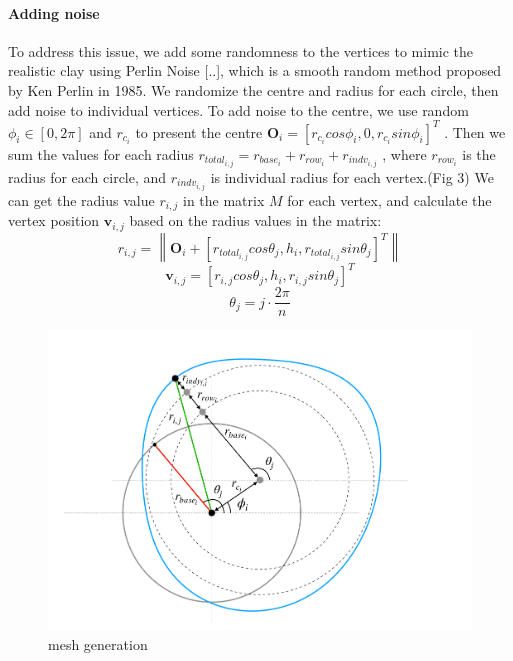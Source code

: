 \paragraph{Adding noise} To address this issue, we add some randomness to the vertices to mimic the realistic clay using Perlin Noise [..], which is a smooth random method proposed by Ken Perlin in 1985. We randomize the centre and radius for each circle, then add noise to individual vertices.
To add noise to the centre, we use random $\phi_{i} \in [0, 2\pi]$ and $r_{c_{i}}$ to present the centre
$\mathbf{O}_{i} = \left[r_{c_{i}}cos\phi_{i}, 0, r_{c_{i}}sin\phi_{i}\right]^T$
. Then we sum the values for each radius
$r_{total_{i,j}} = r_{base_{i}} + r_{row_{i}} + r_{indv_{i,j}}$
, where $r_{row_{i}}$ is the radius for each circle, and $r_{indv_{i,j}}$ is individual radius for each vertex.(Fig 3) We can get the radius value $r_{i,j}$ in the matrix $M$ for each vertex, and calculate the vertex position $\mathbf{v}_{i,j}$ based on the radius values in the matrix:
\begin{equation}
r_{i,j} = \left\|
\mathbf{O}_{i} + \left[ r_{total_{i,j}} cos \theta_{j},
h_{i},
r_{total_{i,j}} sin \theta_{j}
\right]^T
\right\| 
\end{equation}
\begin{equation}
\mathbf{v}_{i,j} =
\left[r_{i,j}  cos \theta_{j},
h_{i},
r_{i,j} sin \theta_{j}\right]^T
\end{equation}
\begin{equation}
\theta_{j} = j \cdot \frac{2\pi}{n}
\end{equation}

\begin{figure}
  \includegraphics[width=\textwidth]{fig4.pdf}
\caption{mesh generation}
\label{fig:1}       %
\end{figure}

